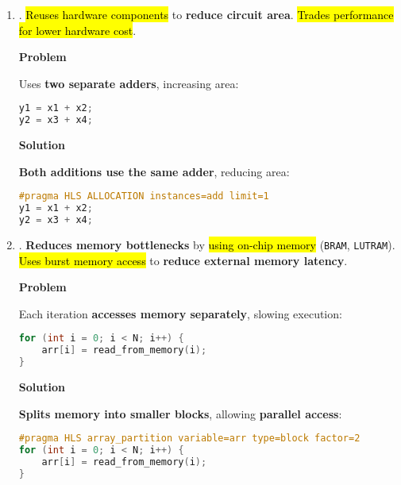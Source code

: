 \begin{enumerate}
    \item {}. \hl{Reuses hardware components} to \textbf{reduce circuit area}. \hl{Trades performance for lower hardware cost}.
    \begin{flushleft}
        \textcolor{Red2}{ \textbf{Problem}}
    \end{flushleft}
    Uses \textbf{two separate adders}, increasing area:
    \begin{lstlisting}[language=c++]
y1 = x1 + x2;
y2 = x3 + x4;\end{lstlisting}
    
    \begin{flushleft}
        \textcolor{Green3}{ \textbf{Solution}}
    \end{flushleft}
    \textbf{Both additions use the same adder}, reducing area:
    \begin{lstlisting}[language=c++]
#pragma HLS ALLOCATION instances=add limit=1
y1 = x1 + x2;
y2 = x3 + x4;\end{lstlisting}


    \item {}. \textbf{Reduces memory bottlenecks} by \hl{using on-chip memory} (\texttt{BRAM}, \texttt{LUTRAM}). \hl{Uses burst memory access} to \textbf{reduce external memory latency}.
    \begin{flushleft}
        \textcolor{Red2}{ \textbf{Problem}}
    \end{flushleft}
    Each iteration \textbf{accesses memory separately}, slowing execution:
    \begin{lstlisting}[language=c++]
for (int i = 0; i < N; i++) {
    arr[i] = read_from_memory(i);
}\end{lstlisting}

    \newpage

    \begin{flushleft}
        \textcolor{Green3}{ \textbf{Solution}}
    \end{flushleft}
    \textbf{Splits memory into smaller blocks}, allowing \textbf{parallel access}:
    \begin{lstlisting}[language=c++]
#pragma HLS array_partition variable=arr type=block factor=2
for (int i = 0; i < N; i++) {
    arr[i] = read_from_memory(i);
}\end{lstlisting}
\end{enumerate}

